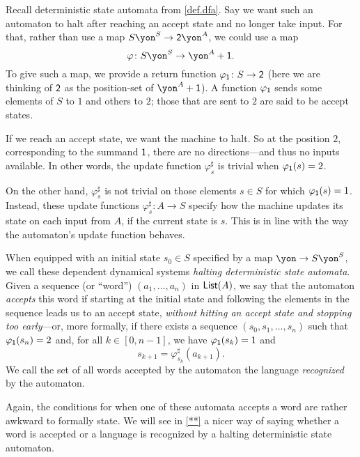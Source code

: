 \documentclass[Book-Poly]{subfiles}
\begin{document}
\begin{example}\label{ex.regular_lang_stop}
Recall deterministic state automata from \cref{def.dfa}.
Say we want such an automaton to halt after reaching an accept state and no longer take input.
For that, rather than use a map $S\yon^S\to \2\yon^A$, we could use a map
\[
\varphi\colon S\yon^S\to \yon^A+\1.
\]
To give such a map, we provide a return function $\varphi_{\textsf{1}}\colon S\to\textsf{2}$ (here we are thinking of $\textsf{2}$ as the position-set of $\yon^A+\1$).
A function $\varphi_{\textsf{1}}$ sends some elements of $S$ to $1$ and others to $2$; those that are sent to $2$ are said to be accept states.

If we reach an accept state, we want the machine to halt.
So at the position $2$, corresponding to the summand $\textsf{1}$, there are no directions---and thus no inputs available.
In other words, the update function $\varphi^\sharp_s$ is trivial when $\varphi_{\textsf{1}}(s)=2$.

On the other hand, $\varphi^\sharp_s$ is not trivial on those elements $s\in S$ for which $\varphi_{\textsf{1}}(s)=1$.
Instead, these update functions $\varphi^\sharp_s\colon A\to S$ specify how the machine updates its state on each input from $A$, if the current state is $s$.
This is in line with the way the automaton's update function behaves.

When equipped with an initial state $s_0\in S$ specified by a map $\yon\to S\yon^S$, we call these dependent dynamical systems \emph{halting deterministic state automata}.
Given a sequence (or ``word'') $(a_1,\ldots,a_n)$ in $\mathsf{List}(A)$, we say that the automaton \emph{accepts} this word if starting at the initial state and following the elements in the sequence leads us to an accept state, \emph{without hitting an accept state and stopping too early}---or, more formally, if there exists a sequence $(s_0,s_1,\ldots,s_n)$ such that $\varphi_{\textsf{1}}(s_n)=2$ and, for all $k\in[0,n-1]$, we have $\varphi_{\textsf{1}}(s_k)=1$ and
\[
    s_{k+1}=\varphi^\sharp_{s_k}(a_{k+1}).
\]
We call the set of all words accepted by the automaton the language \emph{recognized} by the automaton.
\end{example}

\begin{remark}
Again, the conditions for when one of these automata accepts a word are rather awkward to formally state.
We will see in \cref{**} a nicer way of saying whether a word is accepted or a language is recognized by a halting deterministic state automaton.
\end{remark}
\end{document}
